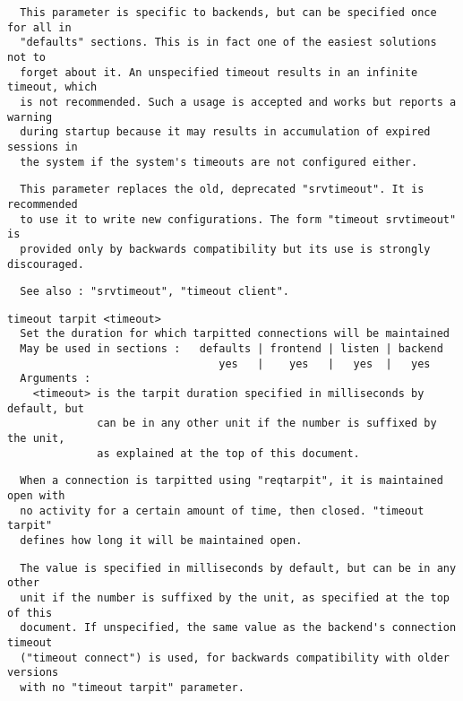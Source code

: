 \begin{verbatim}
  This parameter is specific to backends, but can be specified once for all in
  "defaults" sections. This is in fact one of the easiest solutions not to
  forget about it. An unspecified timeout results in an infinite timeout, which
  is not recommended. Such a usage is accepted and works but reports a warning
  during startup because it may results in accumulation of expired sessions in
  the system if the system's timeouts are not configured either.
\end{verbatim}

\begin{verbatim}
  This parameter replaces the old, deprecated "srvtimeout". It is recommended
  to use it to write new configurations. The form "timeout srvtimeout" is
  provided only by backwards compatibility but its use is strongly discouraged.
\end{verbatim}

\begin{verbatim}
  See also : "srvtimeout", "timeout client".
\end{verbatim}

\begin{verbatim}
timeout tarpit <timeout>
  Set the duration for which tarpitted connections will be maintained
  May be used in sections :   defaults | frontend | listen | backend
                                 yes   |    yes   |   yes  |   yes
  Arguments :
    <timeout> is the tarpit duration specified in milliseconds by default, but
              can be in any other unit if the number is suffixed by the unit,
              as explained at the top of this document.
\end{verbatim}

\begin{verbatim}
  When a connection is tarpitted using "reqtarpit", it is maintained open with
  no activity for a certain amount of time, then closed. "timeout tarpit"
  defines how long it will be maintained open.
\end{verbatim}

\begin{verbatim}
  The value is specified in milliseconds by default, but can be in any other
  unit if the number is suffixed by the unit, as specified at the top of this
  document. If unspecified, the same value as the backend's connection timeout
  ("timeout connect") is used, for backwards compatibility with older versions
  with no "timeout tarpit" parameter.
\end{verbatim}

